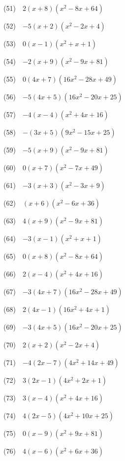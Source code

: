 \documentclass[a4j,twocolumn,10pt,fleqn]{jarticle}
\begin{document}
(51)~~$2\left(x + 8\right) \left(x^{2} - 8 x + 64\right)$

(52)~~$-5\left(x + 2\right) \left(x^{2} - 2 x + 4\right)$

(53)~~$0\left(x - 1\right) \left(x^{2} + x + 1\right)$

(54)~~$-2\left(x + 9\right) \left(x^{2} - 9 x + 81\right)$

(55)~~$0\left(4 x + 7\right) \left(16 x^{2} - 28 x + 49\right)$

(56)~~$-5\left(4 x + 5\right) \left(16 x^{2} - 20 x + 25\right)$

(57)~~$-4\left(x - 4\right) \left(x^{2} + 4 x + 16\right)$

(58)~~$-\left(3 x + 5\right) \left(9 x^{2} - 15 x + 25\right)$

(59)~~$-5\left(x + 9\right) \left(x^{2} - 9 x + 81\right)$

(60)~~$0\left(x + 7\right) \left(x^{2} - 7 x + 49\right)$

(61)~~$-3\left(x + 3\right) \left(x^{2} - 3 x + 9\right)$

(62)~~$\left(x + 6\right) \left(x^{2} - 6 x + 36\right)$

(63)~~$4\left(x + 9\right) \left(x^{2} - 9 x + 81\right)$

(64)~~$-3\left(x - 1\right) \left(x^{2} + x + 1\right)$

(65)~~$0\left(x + 8\right) \left(x^{2} - 8 x + 64\right)$

(66)~~$2\left(x - 4\right) \left(x^{2} + 4 x + 16\right)$

(67)~~$-3\left(4 x + 7\right) \left(16 x^{2} - 28 x + 49\right)$

(68)~~$2\left(4 x - 1\right) \left(16 x^{2} + 4 x + 1\right)$

(69)~~$-3\left(4 x + 5\right) \left(16 x^{2} - 20 x + 25\right)$

(70)~~$2\left(x + 2\right) \left(x^{2} - 2 x + 4\right)$

(71)~~$-4\left(2 x - 7\right) \left(4 x^{2} + 14 x + 49\right)$

(72)~~$3\left(2 x - 1\right) \left(4 x^{2} + 2 x + 1\right)$

(73)~~$3\left(x - 4\right) \left(x^{2} + 4 x + 16\right)$

(74)~~$4\left(2 x - 5\right) \left(4 x^{2} + 10 x + 25\right)$

(75)~~$0\left(x - 9\right) \left(x^{2} + 9 x + 81\right)$

(76)~~$4\left(x - 6\right) \left(x^{2} + 6 x + 36\right)$
\end{document}
